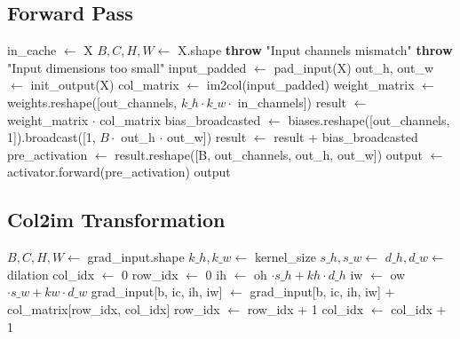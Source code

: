 \documentclass{article}
\begin{document}
\subsection{Forward Pass}
\begin{algorithm}
\caption{Forward Pass}
\begin{algorithmic}[1]
    \State in\_cache $\gets$ X
    \State $B, C, H, W \gets$ X.shape
        \State \textbf{throw} "Input channels mismatch"
    \EndIf
        \State \textbf{throw} "Input dimensions too small"
    \EndIf
    \State input\_padded $\gets$ pad\_input(X)
    \State out\_h, out\_w $\gets$ init\_output(X)
    \State col\_matrix $\gets$ im2col(input\_padded)
    \State weight\_matrix $\gets$ weights.reshape([out\_channels, $k\_h \cdot k\_w \cdot$ in\_channels])
    \State result $\gets$ weight\_matrix $\cdot$ col\_matrix
        \State bias\_broadcasted $\gets$ biases.reshape([out\_channels, 1]).broadcast([1, $B \cdot$ out\_h $\cdot$ out\_w])
        \State result $\gets$ result + bias\_broadcasted
    \EndIf
    \State pre\_activation $\gets$ result.reshape([B, out\_channels, out\_h, out\_w])
    \State output $\gets$ activator.forward(pre\_activation)
    \State \Return output
\EndFunction
\end{algorithmic}
\end{algorithm}

\subsection{Col2im Transformation}
\begin{algorithm}
\caption{Col2im Add}
\begin{algorithmic}[1]
    \State $B, C, H, W \gets$ grad\_input.shape
    \State $k\_h, k\_w \gets$ kernel\_size
    \State $s\_h, s\_w \gets$ 
    \State $d\_h, d\_w \gets$ dilation
    \State col\_idx $\gets$ 0
                \State row\_idx $\gets$ 0
                            \State ih $\gets$ oh $\cdot s\_h + kh \cdot d\_h$
                            \State iw $\gets$ ow $\cdot s\_w + kw \cdot d\_w$
                                \State grad\_input[b, ic, ih, iw] $\gets$ grad\_input[b, ic, ih, iw] + col\_matrix[row\_idx, col\_idx]
                            \EndIf
                            \State row\_idx $\gets$ row\_idx + 1
                        \EndFor
                    \EndFor
                \EndFor
                \State col\_idx $\gets$ col\_idx + 1
            \EndFor
        \EndFor
    \EndFor
\EndFunction
\end{algorithmic}
\end{algorithm}
\end{document}
